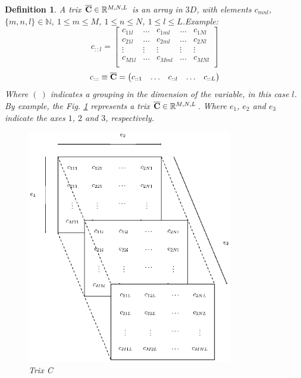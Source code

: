 \documentclass[11pt]{article}
\newcommand{\TRIX}[1]{\mathbf{\overline{\uppercase{#1}}}}
\newcommand{\dimsep}{,}
\newtheorem{definition}{Definition}
\begin{document}
\begin{definition}\label{def:trix}
A trix $\TRIX{C}\in \mathbb{R}^{M\dimsep N\dimsep L}$ is an array in $3D$, with elements $c_{mnl}$, 
$\{m,n,l\}\in\mathbb{N}$, $1 \leq m \leq M$, $1 \leq n \leq N$, $1 \leq l \leq L$.Example:
\begin{equation}
 c_{::l}=\left[
 \begin{matrix}
 c_{11l} &\hdots &c_{1ml} &\hdots &c_{1Nl}\\ 
 c_{21l} &\hdots &c_{2ml} &\hdots &c_{2Nl}\\
 \vdots &\vdots &\vdots &\vdots &\vdots\\ 
 c_{M1l} &\hdots &c_{Mml} &\hdots &c_{MNl}\\ 
 \end{matrix}
 \right]
\end{equation}
\begin{equation}
c_{:::}\equiv \TRIX{C}=\left(
 \begin{matrix}
 c_{::1}&\hdots&c_{::l}&\hdots&c_{::L}\\
 \end{matrix}
 \right)
\end{equation}
Where $(~)$ indicates a grouping in the dimension of the variable, in this case $l$. 
By example, the Fig. \ref{fig:trixC} represents a trix $\TRIX{C}\in \mathbb{R}^{M\dimsep N\dimsep L}$.
Where $e_1$, $e_2$ and $e_3$ indicate the axes $1$, $2$ and $3$, respectively.
\begin{figure}[h]
  \centering
    \includegraphics[width=0.8\textwidth]{trix-img}
    \caption{Trix C}
    \label{fig:trixC}
\end{figure}

\end{definition}
\end{document}
